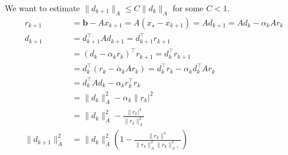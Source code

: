 We want to estimate $\|d_{k+1}\|_A \leq C \|d_k\|_A$ for some $C < 1$.
\begin{align*}
    r_{k+1}         & = \mathbf{b} - A x_{k+1} = A(x_\star - x_{k+1}) = A d_{k+1} = Ad_k - \alpha_k A r_k     \\
    d_{k+1}         & = d_{k+1}^{\top} A d_{k+1} = d_{k+1}^{\top} r_{k+1}                                      \\
                    & = (d_k - \alpha_k r_k)^{\top} r_{k+1} = d_k^{\top} r_{k+1}                               \\
                    & = d_k^{\top} (r_k - \alpha_k A r_k) = d_k^{\top} r_k - \alpha_k d_k^{\top} A r_k              \\
                    & = d_k^{\top} A d_k - \alpha_k r_k^{\top} r_k                                             \\
                    & = \|d_k\|_A^2 - \alpha_k \|r_k|^2                                              \\
                    & = \|d_k\|_A^2 - \frac{\|r_k|^4}{\|r_k\|_A^2}                                   \\
    \|d_{k+1}\|_A^2 & = \|d_k\|_A^2\left(1 - \frac{\|r_k\|^4}{\|r_k\|_A^2 \|r_k\|_{A^{-1}}^2}\right)
\end{align*}
